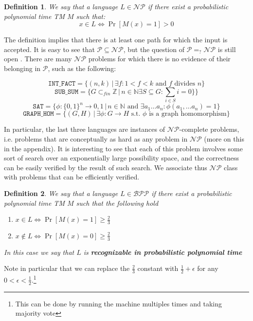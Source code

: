 \documentclass{article}
\newtheorem{definition}{Definition}
\begin{document}
\begin{definition}
We say that a language $L \in \mathcal{NP}$ if there exist a probabilistic polynomial time TM $M$ such that:
\[x \in L \iff \Pr[M(x) = 1] > 0\]
\end{definition}

The definition implies that there is at least one path for which the input is accepted. It is easy to see that $\mathcal{P} \subseteq \mathcal{NP}$, but the question of $\mathcal{P} =_? \mathcal{NP}$ is still open \cite{cookComplexityTheoremprovingProcedures1971} \cite{jaffeMillenniumGrandChallenge2006}. There are many $\mathcal{NP}$ problems for which there is no evidence of their belonging in $\mathcal{P}$, such as the following:

\[ \texttt{INT\_FACT} = \{ (n, k) \, | \, \exists f : 1 < f < k \text { and } f \text{ divides } n\}\]
\[\texttt{SUB\_SUM} = \{ G \subset_{fin} \mathbb{Z} \, | \, n \in \mathbb{N} \exists S \subseteq G : \sum_{i \in S} i = 0  \} \}\]
\[ \texttt{SAT} = \{ \phi : \{0,1\}^n \to {0,1} \, | \, n \in \mathbb{N} \text{ and } \exists a_1 \dots a_n : \phi(a_1, \dots a_n) = 1 \} \]
\[ \texttt{GRAPH\_HOM} = \{ (G, H) \, | \, \exists \phi : G \to H \text{ s.t. $\phi$ is a graph homomorphism} \}\]

In particular, the last three languages are instances of $\mathcal{NP}$-complete problems, i.e. problems that are conceptually as hard as any problem in $\mathcal{NP}$ (more on this in the appendix). It is interesting to see that each of this problem involves some sort of search over an exponentially large possibility space, and the correctness can be easily verified by the result of such search. We associate thus $\mathcal{NP}$ class with problems that can be efficiently verified.

\begin{definition}
We say that a language $L \in \mathcal{BPP}$ if there exist a probabilistic polynomial time TM $M$ such that the following hold
\begin{enumerate}
    \item $x \in L \iff \Pr[M(x) = 1] \geq \frac{2}{3}$
    \item $x \notin L \iff \Pr[M(x) = 0] \geq \frac{2}{3}$
\end{enumerate}
In this case we say that $L$ is \textbf{recognizable in probabilistic polynomial time}
\end{definition}

Note in particular that we can replace the $\frac{2}{3}$ constant with $\frac{1}{2} + \epsilon$ for any $0 < \epsilon < \frac{1}{2}.$\footnote{This can be done by running the machine multiples times and taking majority vote}
\end{document}
